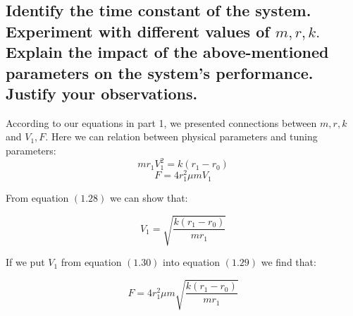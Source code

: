 \documentclass[11pt]{scrartcl} %
\begin{document}
\subsection{Identify the time constant of the system. Experiment with different values of $m, r, k .$ Explain the impact of the above-mentioned parameters on the system's performance. Justify your observations.}
According to our equations in part 1, we presented connections between $m, r, k$ and $V_1, F$. Here we can relation between physical parameters and tuning parameters:
\begin{equation}m r_{1} V_{1}^{2}=k\left(r_{1}-r_{0}\right)\end{equation}
\begin{equation}
F=4 r_{1}^{2} \mu m V_{1}
\end{equation}

From equation $(1.28)$ we can show that:

\begin{equation}
V_1 = \sqrt{\frac{k(r_1 - r_0)}{mr_1}}
\end{equation}

If we put $V_1$ from equation $(1.30)$ into equation $(1.29)$ we find that:

\begin{equation}
F = 4r_1^2\mu m\sqrt{\frac{k(r_1 - r_0)}{mr_1}}
\end{equation}
\end{document}
